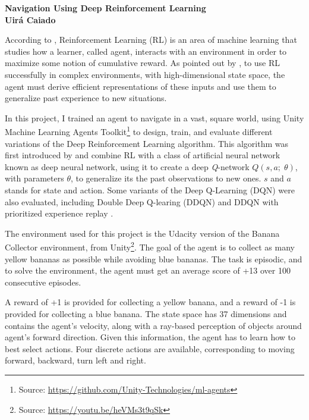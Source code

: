 \documentclass[a4paper]{article}
\begin{document}

\begin{center}

{\bf \large {Navigation Using Deep Reinforcement Learning \\ \small Uirá Caiado}}
\end{center}





According to \cite{spooner2016}, Reinforcement Learning (RL) is an area of machine learning that studies how a learner, called agent, interacts with an environment in order to maximize some notion of cumulative reward. As pointed out by \cite{mnih2015humanlevel}, to use RL successfully in complex environments, with high-dimensional state space, the agent must derive efficient representations of these inputs and use them to generalize past experience to new situations.

In this project, I trained an agent to navigate in a vast, square world, using Unity Machine Learning Agents Toolkit\footnote{Source: \url{https://github.com/Unity-Technologies/ml-agents}} to design, train, and evaluate different variations of the Deep Reinforcement Learning algorithm. This algorithm was first introduced by \cite{mnih2015humanlevel} and combine RL with a class of artificial neural network known as deep neural network, using it to create a 
deep \textit{Q}-network $Q(s, a; \;\theta)$, with parameters $\theta$, to generalize its the past observations to new ones. $s$ and $a$ stands for state and action. Some variants of the Deep Q-Learning (DQN) were also evaluated, including Double Deep Q-learing (DDQN) \cite{HasseltGS15} and DDQN with prioritized experience replay \cite{SchaulQAS15}.

The environment used for this project is the Udacity version of the Banana Collector environment, from Unity\footnote{Source: \url{https://youtu.be/heVMs3t9qSk}}. The goal of the agent is to collect as many yellow bananas as possible while avoiding blue bananas. The task is episodic, and to solve the environment, the agent must get an average score of +13 over 100 consecutive episodes.

A reward of +1 is provided for collecting a yellow banana, and a reward of -1 is provided for collecting a blue banana. The state space has 37 dimensions and contains the agent’s velocity, along with a ray-based perception of objects around agent’s forward direction. Given this information, the agent has to learn how to best select actions. Four discrete actions are available, corresponding to moving forward, backward, turn left and right.
\end{document}
